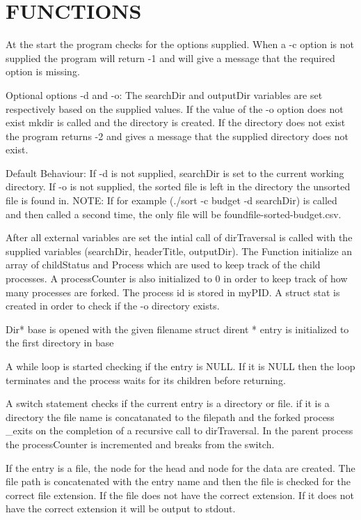 \documentclass{article}
\begin{document}
\section{FUNCTIONS}
\begin{center}
At the start the program checks for the options supplied.
When a -c option is not supplied the program will return -1
and will give a message that the required option is missing.

Optional options -d and -o:
The searchDir and outputDir variables are set respectively based on the supplied values. If the value of the -o option does not exist mkdir is called and the directory is created. If the directory does not exist the program returns -2 and gives a message that the supplied directory does not exist.

Default Behaviour:
If -d is not supplied, searchDir is set to the current working directory.
If -o is not supplied, the sorted file is left in the directory the unsorted file is found in.
NOTE: If for example (./sort -c budget -d searchDir) is called
and then called a second time, the only file will be foundfile-sorted-budget.csv.

After all external variables are set the intial call of dirTraversal is called with the supplied variables (searchDir, headerTitle, outputDir).
The Function initialize an array of childStatus and Process which are used to keep track of the child processes. A processCounter is also initialized to 0 in order to keep track of how many processes are forked. The process id is stored in myPID. A struct stat is created in order to check if the -o directory exists.

Dir* base is opened with the given filename
struct dirent * entry is initialized to the first directory in base

A while loop is started checking if the entry is NULL. If it is NULL then the loop terminates and the process waits for its children before returning.

A switch statement checks if the current entry is a directory or file.
if it is a directory the file name is concatanated to the filepath and the forked process _exits on the completion of a recursive call to dirTraversal. In the parent process the processCounter is incremented and breaks from the switch.

If the entry is a file, the node for the head and node for the data are created. The file path is concatenated with the entry name and then the file is checked for the correct file extension. If the file does not have the correct extension. If it does not have the correct extension it will be output to stdout. 


\end{center}
\end{document}
